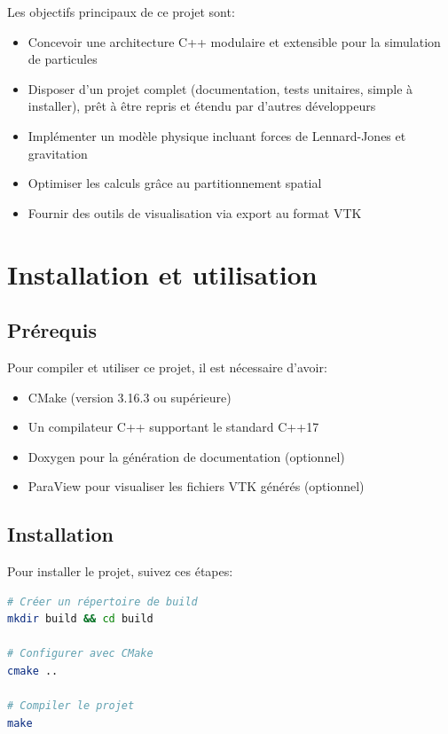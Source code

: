 \documentclass[12pt,a4paper]{article}
\begin{document}
Les objectifs principaux de ce projet sont:
\begin{itemize}
    \item Concevoir une architecture C++ modulaire et extensible pour la simulation de particules
    \item Disposer d'un projet complet (documentation, tests unitaires, simple à installer), prêt à être repris et étendu par d'autres développeurs
    \item Implémenter un modèle physique incluant forces de Lennard-Jones et gravitation
    \item Optimiser les calculs grâce au partitionnement spatial
    \item Fournir des outils de visualisation via export au format VTK
\end{itemize}

\section{Installation et utilisation}

\subsection{Prérequis}

Pour compiler et utiliser ce projet, il est nécessaire d'avoir:
\begin{itemize}
    \item CMake (version 3.16.3 ou supérieure)
    \item Un compilateur C++ supportant le standard C++17
    \item Doxygen pour la génération de documentation (optionnel)
    \item ParaView pour visualiser les fichiers VTK générés (optionnel)
\end{itemize}

\subsection{Installation}

Pour installer le projet, suivez ces étapes:

\begin{lstlisting}[language=bash]
# Créer un répertoire de build
mkdir build && cd build

# Configurer avec CMake
cmake ..

# Compiler le projet
make
\end{lstlisting}
\end{document}
